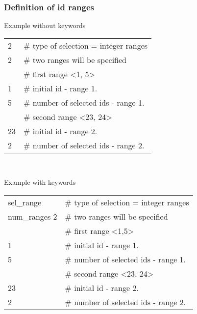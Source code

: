 \subsubsection{Definition of id ranges}
Example without keywords
\begin{center}
\begin{tabular}{|ll|}
\hline
2   & \# type of selection = integer ranges \\
2   & \# two ranges will be specified       \\
    & \# first range <1, 5>                 \\
1   & \# initial id - range 1.              \\
5   & \# number of selected ids - range 1.  \\
    & \# second range <23, 24>              \\
23  & \# initial id - range 2.              \\
2   & \# number of selected ids - range 2.  \\
\hline
\end{tabular}\\
\end{center}
Example with keywords
\begin{center}
\begin{tabular}{|ll|}
\hline
sel\_range    & \# type of selection = integer ranges \\
num\_ranges 2 & \# two ranges will be specified       \\
              & \# first range <1,5>                  \\
1             & \# initial id - range 1.              \\
5             & \# number of selected ids - range 1.  \\
              & \# second range <23, 24>              \\
23            & \# initial id - range 2.              \\
2             & \# number of selected ids - range 2.  \\
\hline
\end{tabular}\\
\end{center}



